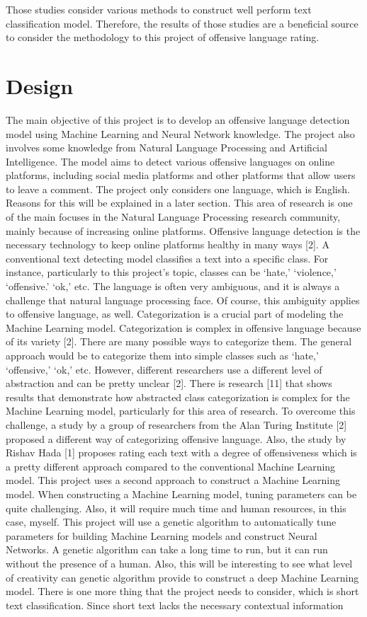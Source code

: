 \documentclass[12pt, natbib=false]{article}
\begin{document}
Those studies consider various methods to construct well perform text classification model. Therefore, the results of those studies are a beneficial source to consider the methodology to this project of offensive language rating. 


\section{Design}

The main objective of this project is to develop an offensive language detection model using Machine Learning and Neural Network knowledge. The project also involves some knowledge from Natural Language Processing and Artificial Intelligence. The model aims to detect various offensive languages on online platforms, including social media platforms and other platforms that allow users to leave a comment. The project only considers one language, which is English. Reasons for this will be explained in a later section. This area of research is one of the main focuses in the Natural Language Processing research community, mainly because of increasing online platforms. Offensive language detection is the necessary technology to keep online platforms healthy in many ways [2]. A conventional text detecting model classifies a text into a specific class. For instance, particularly to this project’s topic, classes can be ‘hate,’ ‘violence,’ ‘offensive.’ ‘ok,’ etc. The language is often very ambiguous, and it is always a challenge that natural language processing face. Of course, this ambiguity applies to offensive language, as well. Categorization is a crucial part of modeling the Machine Learning model. Categorization is complex in offensive language because of its variety [2]. There are many possible ways to categorize them. The general approach would be to categorize them into simple classes such as ‘hate,’ ‘offensive,’ ‘ok,’ etc. However, different researchers use a different level of abstraction and can be pretty unclear [2]. There is research [11] that shows results that demonstrate how abstracted class categorization is complex for the Machine Learning model, particularly for this area of research. To overcome this challenge, a study by a group of researchers from the Alan Turing Institute [2] proposed a different way of categorizing offensive language. Also, the study by Rishav Hada [1] proposes rating each text with a degree of offensiveness which is a pretty different approach compared to the conventional Machine Learning model. This project uses a second approach to construct a Machine Learning model. When constructing a Machine Learning model, tuning parameters can be quite challenging. Also, it will require much time and human resources, in this case, myself. This project will use a genetic algorithm to automatically tune parameters for building Machine Learning models and construct Neural Networks. A genetic algorithm can take a long time to run, but it can run without the presence of a human. Also, this will be interesting to see what level of creativity can genetic algorithm provide to construct a deep Machine Learning model. There is one more thing that the project needs to consider, which is short text classification. Since short text lacks the necessary contextual information 
\end{document}
